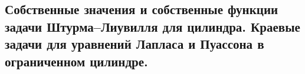 \subsection{Собственные значения и собственные функции задачи Штурма–Лиувилля для цилиндра. Краевые задачи для уравнений Лапласа и Пуассона в ограниченном цилиндре.}